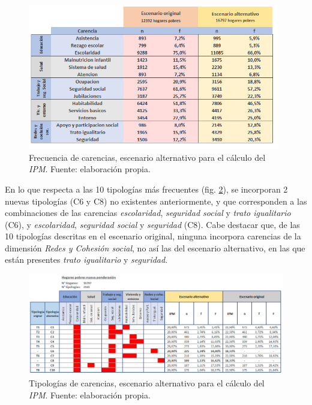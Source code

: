 \documentclass[12pt,letterpaper,spanish]{article}
\begin{document}
\begin{figure}[H]
    \centering
        \includegraphics[width=11cm]{Max/tabla_frec_sensible.png}
    \caption{Frecuencia de carencias, escenario alternativo para el cálculo del \textit{IPM}. Fuente: elaboración propia.}
    \label{frecsen}
\end{figure}

En lo que respecta a las 10 tipologías más frecuentes (fig. \ref{tipsen}), se incorporan 2 nuevas tipologías (C6 y C8) no existentes anteriormente, y que corresponden a las combinaciones de las carencias \textit{escolaridad}, \textit{seguridad social} y \textit{trato igualitario} (C6), y \textit{escolaridad}, \textit{seguridad social}  y \textit{seguridad} (C8). Cabe destacar que, de las 10 tipologías descritas en el escenario original,  ninguna incorpora carencias de la dimensión \textit{Redes y Cohesión social}, no así las del escenario alternativo, en las que están presentes \textit{trato igualitario} y \textit{seguridad}.  


\begin{figure}[H]
    \centering
        \includegraphics[width=\textwidth]{Max/tipologias_sensible_total.png}
    \caption{Tipologías de carencias, escenario alternativo para el cálculo del \textit{IPM}. Fuente: elaboración propia.}
    \label{tipsen}
\end{figure}
\end{document}
